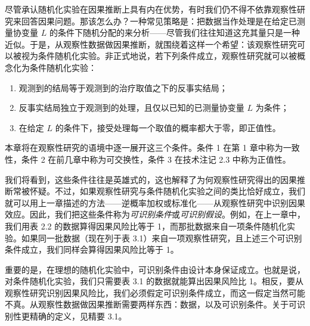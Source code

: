 尽管承认随机化实验在因果推断上具有内在优势，有时我们仍不得不依靠观察性研究来回答因果问题。那该怎么办？一种常见策略是：把数据当作处理是在给定已测量协变量 $L$ 的条件下随机分配的来分析——尽管我们往往知道这充其量只是一种近似。于是，从观察性数据做因果推断，就围绕着这样一个希望：该观察性研究可以被视为条件随机化实验。非正式地说，若下列条件成立，观察性研究就可以被概念化为条件随机化实验：

\begin{enumerate}
\item 观测到的结局等于观测到的治疗取值之下的反事实结局；
\item 反事实结局独立于观测到的处理，且仅以已知的已测量协变量 $L$ 为条件；
\item 在给定 $L$ 的条件下，接受处理每一个取值的概率都大于零，即正值性。
\end{enumerate}

本章将在观察性研究的语境中逐一展开这三个条件。条件 1 在第 1 章中称为一致性，条件 2 在前几章中称为可交换性，条件 3 在技术注记 2.3 中称为正值性。

我们将看到，这些条件往往是英雄式的，这也解释了为何观察性研究得出的因果推断常被怀疑。不过，如果观察性研究与条件随机化实验之间的类比恰好成立，我们就可以用上一章描述的方法——逆概率加权或标准化——从观察性研究中识别因果效应。因此，我们把这些条件称为\emph{可识别条件}或\emph{可识别假设}。例如，在上一章中，我们用表 2.2 的数据算得因果风险比等于 1，而那批数据来自一项条件随机化实验。如果同一批数据（现在列于表 3.1）来自一项观察性研究，且上述三个可识别条件成立，我们同样会算得因果风险比等于 1。


重要的是，在理想的随机化实验中，可识别条件由设计本身保证成立。也就是说，对条件随机化实验，我们只需要表 3.1 的数据就能算出因果风险比 1。相反，要从观察性研究识别因果风险比，我们必须假定可识别条件成立，而这一假定当然可能不真。从观察性数据做因果推断需要两样东西：数据，以及可识别条件。关于可识别性更精确的定义，见精要 3.1。


